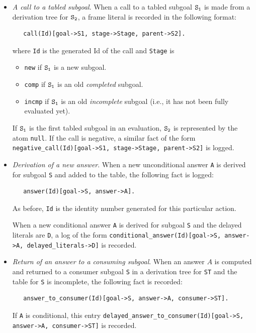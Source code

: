 \documentclass[11pt]{article}
\begin{document}
\begin{itemize}
\item \emph{A call to a tabled subgoal}. When a call to a tabled subgoal $\tt S_1$ is
  made from a derivation tree for $\tt S_2$, a frame literal is recorded in
  the following format:
\begin{verbatim}
   call(Id)[goal->S1, stage->Stage, parent->S2].
\end{verbatim}
  where {\tt Id} is the generated Id of the call and {\tt Stage} is
  \begin{itemize}
  \item {\tt new} if $\tt S_1$ is a new subgoal.
  \item {\tt comp} if $\tt S_1$ is an old \emph{completed} subgoal.
  \item {\tt incmp} if $\tt S_1$ is an old \emph{incomplete} subgoal (i.e., it
    has not been fully evaluated yet).
  \end{itemize}

  If $\tt S_1$ is the first tabled subgoal in an evaluation, $\tt S_2$ is
  represented by the atom {\tt null}.
  If the call is negative, a similar fact of the form
  {\tt negative\_call(Id)[goal->S1, stage->Stage, parent->S2]} is logged. 
  
\item \emph{Derivation of a new answer}. When a new unconditional
  answer {\tt A} is derived for  
  subgoal \texttt{S}  and added to the table, the following fact is logged:
\begin{verbatim}
   answer(Id)[goal->S, answer->A].
\end{verbatim}
  As before, {\tt Id} is the identity number generated for this particular
  action. 

  When a new conditional answer {\tt A} is derived for subgoal \texttt{S}
  and the delayed literals are {\tt D}, a log of the form
  {\tt conditional\_answer(Id)[goal->S, answer->A, delayed\_literals->D]}
  is recorded. 

\item \emph{Return of an answer to a consuming subgoal}. When an answer $A$ is
  computed and
  returned to a consumer subgoal \texttt{S} in a derivation tree for
  \texttt{ST}  and the
  table for \texttt{S}
  is incomplete, the following fact is recorded:
\begin{verbatim}  
   answer_to_consumer(Id)[goal->S, answer->A, consumer->ST].
\end{verbatim}  
  If \texttt{A} is conditional, this entry
  {\tt delayed\_answer\_to\_consumer(Id)[goal->S, answer->A, consumer->ST]} 
  is recorded. 


\end{itemize}
\end{document}

